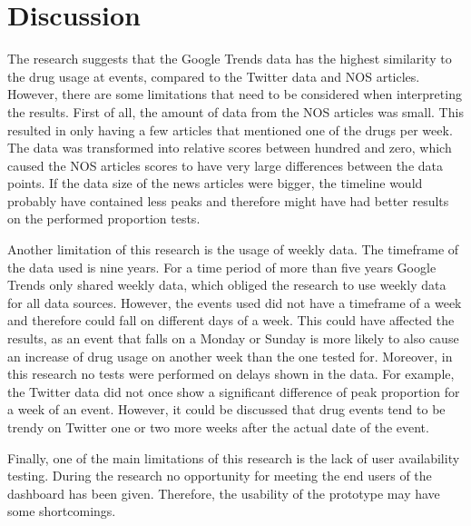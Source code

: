 \section{Discussion}
The research suggests that the Google Trends data has the highest similarity to the drug usage at events, compared to the Twitter data and NOS articles. However, there are some limitations that need to be considered when interpreting the results. First of all, the amount of data from the NOS articles was small. This resulted in only having a few articles that mentioned one of the drugs per week. The data was transformed into relative scores between hundred and zero, which caused the NOS articles scores to have very large differences between the data points. If the data size of the news articles were bigger, the timeline would probably have contained less peaks and therefore might have had better results on the performed proportion tests.

Another limitation of this research is the usage of weekly data. The timeframe of the data used is nine years. For a time period of more than five years Google Trends only shared weekly data, which obliged the research to use weekly data for all data sources. However, the events used did not have a timeframe of a week and therefore could fall on different days of a week. This could have affected the results, as an event that falls on a Monday or Sunday is more likely to also cause an increase of drug usage on another week than the one tested for.
Moreover, in this research no tests were performed on delays shown in the data. For example, the Twitter data did not once show a significant difference of peak proportion for a week of an event. However, it could be discussed that drug events tend to be trendy on Twitter one or two more weeks after the actual date of the event.

Finally, one of the main limitations of this research is the lack of user availability testing. During the research no opportunity for meeting the end users of the dashboard has been given. Therefore, the usability of the prototype may have some shortcomings.

